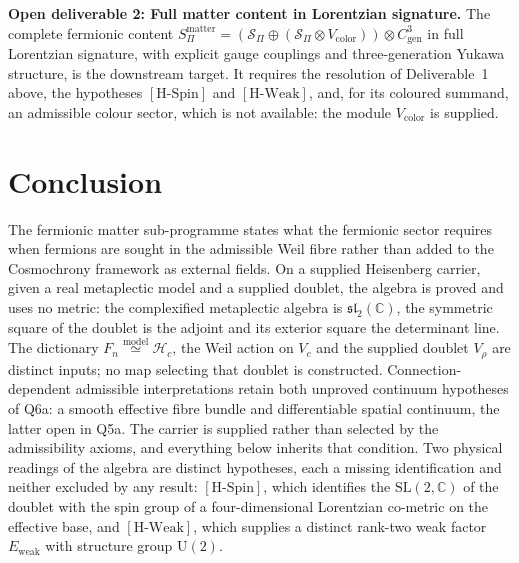 \documentclass[11pt,a4paper]{article}
\theoremstyle{definition}
\newcommand{\UU}{\mathrm{U}}
\newcommand{\SL}{\mathrm{SL}}
\newcommand{\Vr}{V_\rho}
\newcommand{\Sbundle}{\mathcal{S}_\Pi}
\newcommand{\Cgen}{C^3_{\mathrm{gen}}}
\newcommand{\Ew}{E_{\mathrm{weak}}}
\newcommand{\HSpin}{\ensuremath{[\mathrm{H\text{-}Spin}]}}
\newcommand{\HWeak}{\ensuremath{[\mathrm{H\text{-}Weak}]}}
\begin{document}
    \textbf{Open deliverable 2: Full matter content in Lorentzian signature.}
    The complete fermionic content
    $S^\mathrm{matter}_\Pi = (\Sbundle \oplus (\Sbundle \otimes V_{\mathrm{color}})) \otimes \Cgen$
    in full Lorentzian signature, with explicit gauge couplings and three-generation Yukawa
    structure, is the downstream target.
    It requires the resolution of Deliverable~1 above, the hypotheses \HSpin{} and \HWeak{}, and, for its coloured
    summand, an admissible colour sector, which is not available: the module $V_{\mathrm{color}}$ is supplied.

    \newpage
  \section{Conclusion}
    \label{sec:conclusion}

    The fermionic matter sub-programme states what the fermionic sector requires when fermions are sought in the
    admissible Weil fibre rather than added to the Cosmochrony framework as external fields.
    On a supplied Heisenberg carrier, given a real metaplectic model and a supplied doublet, the algebra is proved
    and uses no metric: the complexified metaplectic algebra is $\mathfrak{sl}_2(\mathbb{C})$, the symmetric square of
    the doublet is the adjoint and its exterior square the determinant line.
    The dictionary $F_n \overset{\mathrm{model}}{\simeq} \mathcal{H}_c$, the Weil action on $V_c$ and
    the supplied doublet $\Vr$ are distinct inputs; no map selecting that doublet is constructed.
    Connection-dependent admissible interpretations retain both unproved continuum hypotheses of Q6a:
    a smooth effective fibre bundle and differentiable spatial continuum, the latter open in Q5a.
    The carrier is supplied rather than selected by the admissibility axioms, and everything below
    inherits that condition.
    Two physical readings of the algebra are distinct hypotheses, each a missing identification and neither excluded
    by any result: \HSpin{}, which identifies the $\SL(2,\mathbb{C})$ of the doublet with the spin group of a
    four-dimensional Lorentzian co-metric on the effective base, and \HWeak{}, which supplies a distinct rank-two weak
    factor $\Ew$ with structure group $\UU(2)$.
\end{document}
